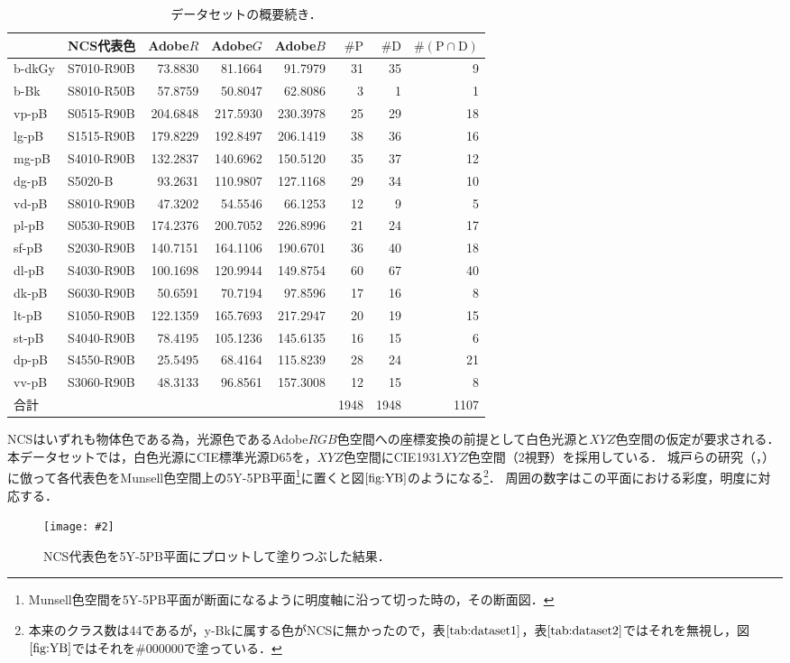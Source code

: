 \documentclass[uplatex,paper=a4,fontsize=4.0truemm,jafontsize=4.0truemm,head_space=30.0truemm,foot_space=30.0truemm,baselineskip=8.0truemm,line_length=40zw,gutter=25.0truemm,oneside,openany,fleqn,hanging_panctuation,open_bracket_pos=nibu_tentsuki,dvipdfmx,jis2004,book,titlepage]{jlreq}
\theoremstyle{mystyle}
\newcommand{\zwspace}{\hspace{1zw}\relax}
\newcommand{\captiondot}[1]{\caption{#1．}}
\newcommand{\figureinput}[4]{\begin{figure}[tbp]\centering\texttt{[image: \#2]}\captiondot{#3}\label{fig:#4}\end{figure}}
\newcommand{\tableinput}[4]{\begin{table}[tbp]\centering\captiondot{#3}\label{tab:#4}\begin{tabular}{#1}#2\end{tabular}\end{table}}
\newcommand{\mathdisplaystyle}[1]{\(\displaystyle{#1}\)}
\newcommand{\Reference}[1]{\mathdisplaystyle{\ref{#1}}}
\newcommand{\parentheses}[1]{\left(#1\right)}
\begin{document}
			\tableinput{l|lrrrrrr}{ & NCS代表色 & Adobe\(R\) & Adobe\(G\) & Adobe\(B\) & \(\#\textrm{P}\) & \(\#\textrm{D}\) & \(\#\parentheses{\text{P}\cap\text{D}}\) \\ \hline
				b-dkGy & S7010-R90B & 73.8830 & 81.1664 & 91.7979 & 31 & 35 & 9 \\
				b-Bk & S8010-R50B & 57.8759 & 50.8047 & 62.8086 & 3 & 1 & 1 \\
				vp-pB & S0515-R90B & 204.6848 & 217.5930 & 230.3978 & 25 & 29 & 18 \\
				lg-pB & S1515-R90B & 179.8229 & 192.8497 & 206.1419 & 38 & 36 & 16 \\
				mg-pB & S4010-R90B & 132.2837 & 140.6962 & 150.5120 & 35 & 37 & 12 \\
				dg-pB & S5020-B & 93.2631 & 110.9807 & 127.1168 & 29 & 34 & 10 \\
				vd-pB & S8010-R90B & 47.3202 & 54.5546 & 66.1253 & 12 & 9 & 5 \\
				pl-pB & S0530-R90B & 174.2376 & 200.7052 & 226.8996 & 21 & 24 & 17 \\
				sf-pB & S2030-R90B & 140.7151 & 164.1106 & 190.6701 & 36 & 40 & 18 \\
				dl-pB & S4030-R90B & 100.1698 & 120.9944 & 149.8754 & 60 & 67 & 40 \\
				dk-pB & S6030-R90B & 50.6591 & 70.7194 & 97.8596 & 17 & 16 & 8 \\
				lt-pB & S1050-R90B & 122.1359 & 165.7693 & 217.2947 & 20 & 19 & 15 \\
				st-pB & S4040-R90B & 78.4195 & 105.1236 & 145.6135 & 16 & 15 & 6 \\
				dp-pB & S4550-R90B & 25.5495 & 68.4164 & 115.8239 & 28 & 24 & 21 \\
				vv-pB & S3060-R90B & 48.3133 & 96.8561 & 157.3008 & 12 & 15 & 8 \\ \hline
				合計 &  &  &  &  & 1948 & 1948 & 1107}{データセットの概要\zwspace 続き}{dataset2}
			NCSはいずれも物体色である為，光源色であるAdobe\mathdisplaystyle{RGB}色空間への座標変換の前提として白色光源と\mathdisplaystyle{XYZ}色空間の仮定が要求される．
			本データセットでは，白色光源にCIE標準光源D65を，\mathdisplaystyle{XYZ}色空間にCIE1931\mathdisplaystyle{XYZ}色空間（2\textdegree 視野）\cite[pp.~28--30]{Yaguchi2017a}を採用している．
			城戸らの研究（\cite[図1]{Kido2017}，\cite[図1]{Kido2018}）に倣って各代表色をMunsell色空間上の5Y-5PB平面\footnote{Munsell色空間を5Y-5PB平面が断面になるように明度軸に沿って切った時の，その断面図．}に置くと図\Reference{fig:YB}のようになる\footnote{本来のクラス数は44であるが，y-Bkに属する色がNCSに無かったので，表\Reference{tab:dataset1}，表\Reference{tab:dataset2}ではそれを無視し，図\Reference{fig:YB}ではそれを\#000000で塗っている．}．
			周囲の数字はこの平面における彩度，明度に対応する．
			\figureinput{width=\linewidth}{D:/a/figs/YB.png}{NCS代表色を5Y-5PB平面にプロットして塗りつぶした結果}{YB}
\end{document}
